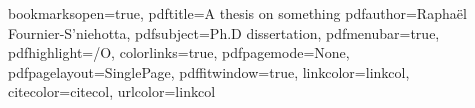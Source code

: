 \renewcommand{\nomname}{Liste des Abréviations}

\renewcommand{\algorithmicrequire} {\textbf{\textsc{Entrées:}}}
\renewcommand{\algorithmicensure}  {\textbf{\textsc{Sorties:}}}
\renewcommand{\algorithmicwhile}   {\textbf{tantque}}
\renewcommand{\algorithmicdo}      {\textbf{faire}}
\renewcommand{\algorithmicendwhile}{\textbf{fin tantque}}
\renewcommand{\algorithmicend}     {\textbf{fin}}
\renewcommand{\algorithmicif}      {\textbf{si}}
\renewcommand{\algorithmicendif}   {\textbf{finsi}}
\renewcommand{\algorithmicelse}    {\textbf{sinon}}
\renewcommand{\algorithmicthen}    {\textbf{alors}}
\renewcommand{\algorithmicfor}     {\textbf{pour}}
\renewcommand{\algorithmicforall}  {\textbf{pour tout}}
\renewcommand{\algorithmicdo}      {\textbf{faire}}
\renewcommand{\algorithmicendfor}  {\textbf{fin pour}}
\renewcommand{\algorithmicloop}    {\textbf{boucler}}
\renewcommand{\algorithmicendloop} {\textbf{fin boucle}}
\renewcommand{\algorithmicrepeat}  {\textbf{répéter}}
\renewcommand{\algorithmicuntil}   {\textbf{jusqu'à}}

\newcommand{\figsize}{0.8\columnwidth}

\setcounter{secnumdepth}{15}
\setcounter{tocdepth}{15}

\renewcommand*{\backref}[1]{}
\renewcommand*{\backrefalt}[4]{%
\ifcase #1 %
(Non cité.)%
\or
(Cité en page~#2.)%
\else
(Cité en pages~#2.)%
\fi}
\renewcommand*{\backrefsep}{, }
\renewcommand*{\backreftwosep}{ et~}
\renewcommand*{\backreflastsep}{ et~}

\makenomenclature



 \hypersetup
 {
 bookmarksopen=true,
 pdftitle=A thesis on something
 pdfauthor=Raphaël Fournier-S'niehotta, %
 pdfsubject=Ph.D dissertation, %
 pdfmenubar=true, %
 pdfhighlight=/O, %
 colorlinks=true, %
 pdfpagemode=None, %
 pdfpagelayout=SinglePage, %
 pdffitwindow=true, %
 linkcolor=linkcol, %
 citecolor=citecol, %
 urlcolor=linkcol %
 }


\setcounter{secnumdepth}{3}
\setcounter{tocdepth}{2}
\setlength{\parskip}{1ex plus 1ex minus 1ex}
